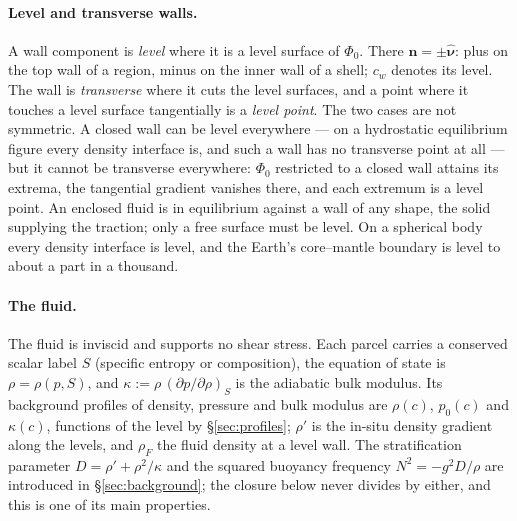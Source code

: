 \documentclass[11pt]{article}
\theoremstyle{definition}
\theoremstyle{remark}
\newcommand{\bn}{\mathbf{n}}
\newcommand{\nuh}{\hat{\boldsymbol{\nu}}}
\begin{document}
\paragraph{Level and transverse walls.} A wall component is
\emph{level} where it is a level surface of $\Phi_0$. There $\bn =
\pm\nuh$: plus on the top wall of a region, minus on the inner wall of
a shell; $c_w$ denotes its level. The wall is \emph{transverse} where
it cuts the level surfaces, and a point where it touches a level
surface tangentially is a \emph{level point}. The two cases are not
symmetric. A closed wall can be level everywhere --- on a hydrostatic
equilibrium figure every density interface is, and such a wall has
no transverse point at all --- but it cannot be transverse
everywhere: $\Phi_0$ restricted to a closed wall attains its extrema,
the tangential gradient vanishes there, and each extremum is a level
point. An enclosed fluid is in equilibrium against a wall of any
shape, the solid supplying the traction; only a free surface must be
level. On a spherical body every density interface is level, and the
Earth's core--mantle boundary is level to about a part in a thousand.

\paragraph{The fluid.} The fluid is inviscid and supports no shear
stress. Each parcel carries a conserved scalar label $S$ (specific
entropy or composition), the equation of state is $\rho = \rho(p,
S)$, and $\kappa := \rho\,(\partial p/\partial\rho)_S$ is the adiabatic
bulk modulus. Its background profiles of density, pressure and bulk
modulus are $\rho(c)$, $p_0(c)$ and $\kappa(c)$, functions of the
level by \S\ref{sec:profiles}; $\rho'$ is the in-situ density gradient
along the levels, and $\rho_F$ the fluid density at a level wall. The
stratification parameter $D = \rho' + \rho^2/\kappa$ and the squared
buoyancy frequency $N^2 = -g^2D/\rho$ are introduced in
\S\ref{sec:background}; the closure below never divides by either,
and this is one of its main properties.
\end{document}
